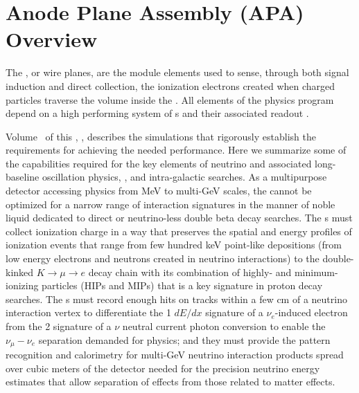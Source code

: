 \section{Anode Plane Assembly (APA) Overview}
\label{sec:fdsp-apa-intro}

The , or wire planes, are the   module elements used to sense, through both signal induction and direct collection, the ionization electrons created when charged particles traverse the  volume inside the .   All elements of the  physics program depend on a high performing system of s and their associated readout .  

Volume~\volnumberphysics{} of this , \voltitlephysics, %
describes the simulations that rigorously establish the requirements for achieving the needed performance.  Here we summarize some of the  capabilities required for the key elements of neutrino  and associated long-baseline oscillation physics, , and intra-galactic  searches.  As a multipurpose detector accessing physics from MeV to multi-GeV scales, the   cannot be optimized for a narrow range of interaction signatures in the manner of noble liquid  dedicated to direct  or neutrino-less double beta decay searches.  The s must collect ionization charge in a way that preserves the spatial and energy profiles of ionization events that range from few hundred keV point-like depositions (from low energy electrons and neutrons created in  neutrino interactions) to the double-kinked $K\rightarrow\mu\rightarrow{e}$ decay chain with its combination of highly- and minimum-ionizing particles (HIPs and MIPs) that is a key signature in proton decay searches.  The s must record enough hits on tracks within a few cm of a neutrino interaction vertex to differentiate the 1  $dE/dx$ signature of a $\nu_e$-induced electron from the 2  signature of a $\nu$ neutral current photon conversion to enable the $\nu_\mu-\nu_e$ separation demanded for  physics; and they must provide the pattern recognition and calorimetry for multi-GeV neutrino interaction products  spread over cubic meters of the detector needed for the precision neutrino energy estimates that allow separation of  effects from those related to matter effects. 
 
